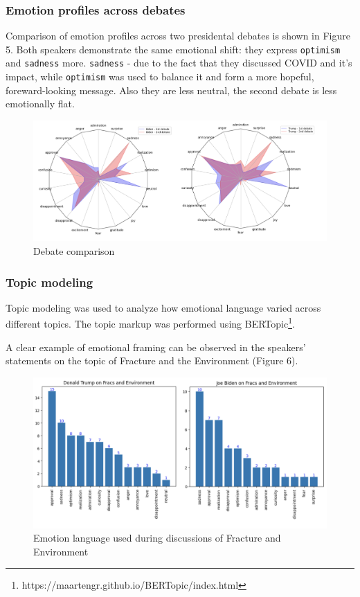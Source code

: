 \documentclass[pdflatex,sn-mathphys-num]{sn-jnl}%
\begin{document}
\newpage
\subsubsection{Emotion profiles across debates}


Comparison of emotion profiles across two presidental debates is shown in Figure 5.
Both speakers demonstrate the same emotional shift: they express \texttt{optimism} and \texttt{sadness} more. \texttt{sadness} - due to the fact that they discussed COVID and it's impact, while \texttt{optimism} was used to balance it and form a more hopeful, foreward-looking message. Also they are less neutral, the second debate is less emotionally flat.

\begin{figure}[h]
	\centering
	\includegraphics[width=14cm]{f5-debate_comparison.png}
	\caption{Debate comparison}
\end{figure}

\subsubsection{Topic modeling}

Topic modeling was used to analyze how emotional language varied across different topics. The topic markup was performed using BERTopic\footnote{https://maartengr.github.io/BERTopic/index.html}.

A clear example of emotional framing can be observed in the speakers' statements on the topic of Fracture and the Environment (Figure 6).

\begin{figure}[H]
	\centering
	\includegraphics[width=14cm]{f6-fracture_and_environment.png}
	\caption{Emotion language used during discussions of Fracture and Environment}
\end{figure}
\end{document}
